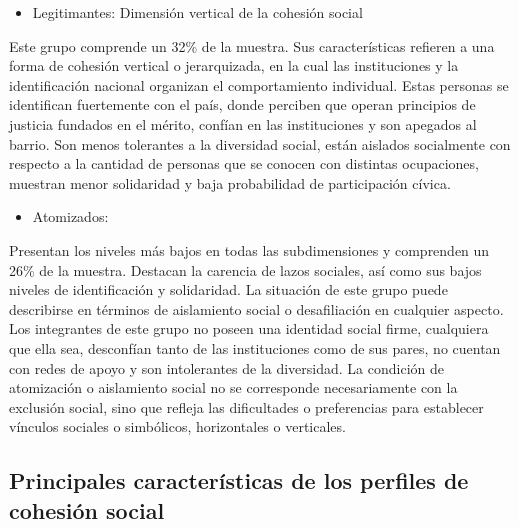 \documentclass[
  12pt,
]{book}
\providecommand{\tightlist}{%
  \setlength{\itemsep}{0pt}\setlength{\parskip}{0pt}}
\begin{document}
\begin{itemize}
\tightlist
\item
  Legitimantes: Dimensión vertical de la cohesión social
\end{itemize}

Este grupo comprende un 32\% de la muestra. Sus características refieren a una forma de cohesión vertical o jerarquizada, en la cual las instituciones y la identificación nacional organizan el comportamiento individual. Estas personas se identifican fuertemente con el país, donde perciben que operan principios de justicia fundados en el mérito, confían en las instituciones y son apegados al barrio. Son menos tolerantes a la diversidad social, están aislados socialmente con respecto a la cantidad de personas que se conocen con distintas ocupaciones, muestran menor solidaridad y baja probabilidad de participación cívica.

\begin{itemize}
\tightlist
\item
  Atomizados:
\end{itemize}

Presentan los niveles más bajos en todas las subdimensiones y comprenden un 26\% de la muestra. Destacan la carencia de lazos sociales, así como sus bajos niveles de identificación y solidaridad. La situación de este grupo puede describirse en términos de aislamiento social o desafiliación en cualquier aspecto. Los integrantes de este grupo no poseen una identidad social firme, cualquiera que ella sea, desconfían tanto de las instituciones como de sus pares, no cuentan con redes de apoyo y son intolerantes de la diversidad. La condición de atomización o aislamiento social no se corresponde necesariamente con la exclusión social, sino que refleja las dificultades o preferencias para establecer vínculos sociales o simbólicos, horizontales o verticales.

\hypertarget{principales-caracteruxedsticas-de-los-perfiles-de-cohesiuxf3n-social}{%
\subsection{Principales características de los perfiles de cohesión social}\label{principales-caracteruxedsticas-de-los-perfiles-de-cohesiuxf3n-social}}
\end{document}
